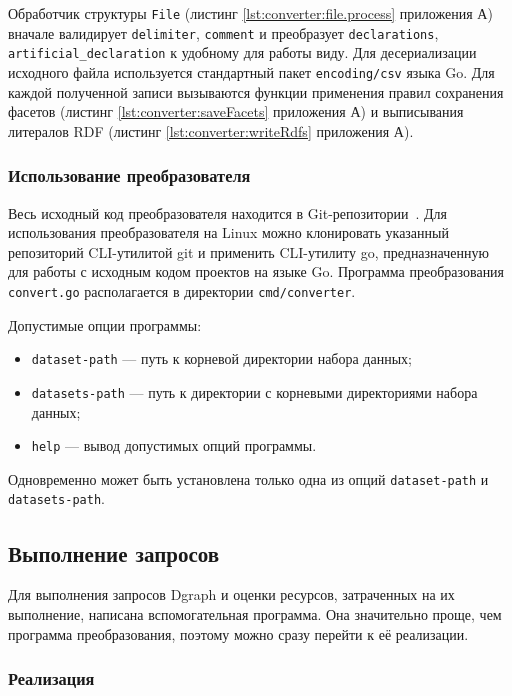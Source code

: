 Обработчик структуры \texttt{File} (листинг \ref{lst:converter:file.process} приложения А) вначале валидирует
\texttt{delimiter}, \texttt{comment} и преобразует \texttt{declarations}, \texttt{artificial\_declaration} к удобному
для работы виду. Для десериализации исходного файла используется стандартный пакет \texttt{encoding/csv} языка Go. Для
каждой полученной записи вызываются функции применения правил сохранения фасетов (листинг \ref{lst:converter:saveFacets}
приложения А) и выписывания литералов RDF (листинг \ref{lst:converter:writeRdfs} приложения А). 

\subsubsection{Использование преобразователя}

Весь исходный код преобразователя находится в Git-репозитории~\cite{sources}. Для использования преобразователя на Linux
можно клонировать указанный репозиторий CLI-утилитой git и применить CLI-утилиту go, предназначенную для работы с
исходным кодом проектов на языке Go. Программа преобразования \texttt{convert.go} располагается в директории
\texttt{cmd/converter}.

Допустимые опции программы:
\begin{itemize}
  \item \texttt{dataset-path} --- путь к корневой директории набора данных;
  \item \texttt{datasets-path} --- путь к директории с корневыми директориями набора данных;
  \item \texttt{help} --- вывод допустимых опций программы.
\end{itemize}
Одновременно может быть установлена только одна из опций \texttt{dataset-path} и \texttt{datasets-path}.

\subsection{Выполнение запросов}

Для выполнения запросов Dgraph и оценки ресурсов, затраченных на их выполнение, написана вспомогательная программа.
Она значительно проще, чем программа преобразования, поэтому можно сразу перейти к её реализации.

\subsubsection{Реализация}

